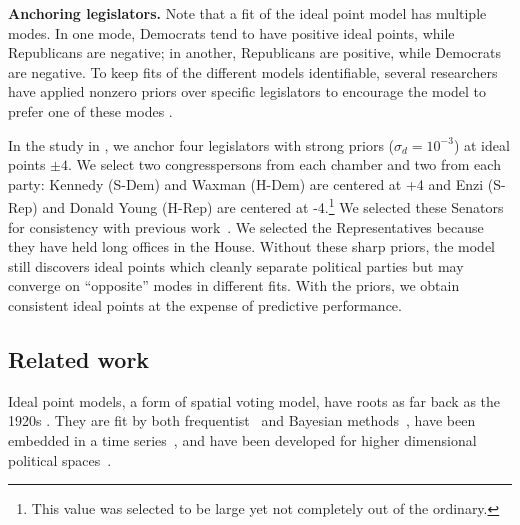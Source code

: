 

\textbf{Anchoring legislators.}  Note that a fit of the ideal point
model has multiple modes.  In one mode, Democrats tend to have
positive ideal points, while Republicans are negative; in another,
Republicans are positive, while Democrats are negative.  To keep fits
of the different models identifiable, several researchers have applied
nonzero priors over specific legislators to encourage the model to
prefer one of these modes
\cite{jackman:2001,clinton:2004,martin:2002}.

In the study in , we anchor four legislators with
strong priors ($\sigma_d = 10^{-3}$) at ideal points $\pm 4$.  We
select two congresspersons from each chamber and two from each party:
Kennedy (S-Dem) and Waxman (H-Dem) are centered at +4 and Enzi (S-Rep)
and Donald Young (H-Rep) are centered at -4.\footnote{This value was
selected to be large yet not completely out of the ordinary.} We
selected these Senators for consistency with previous
work~\cite{clinton:2004}.  We selected the Representatives because
they have held long offices in the House.  Without these sharp priors,
the model still discovers ideal points which cleanly separate
political parties but may converge on ``opposite'' modes in different
fits.  With the priors, we obtain consistent ideal points at the
expense of predictive performance.

\subsection{Related work}


Ideal point models, a form of spatial voting model, have roots as far
back as the 1920s \cite{enelow:1984}. They are fit by both
frequentist~\cite{poole:1985,heckman:1996} and Bayesian
methods~\cite{jackman:2001,martin:2002,clinton:2004}, have been
embedded in a time series~\cite{martin:2002,wang:2010}, and have been
developed for higher dimensional political
spaces~\cite{jackman:2001,heckman:1996}.

\nocite{johnson:1999ch6}

